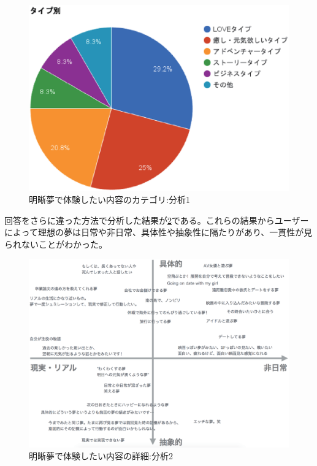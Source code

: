 \begin{figure}[htbp]
\begin{center}
\includegraphics[width=15cm]{eps/dreamType.eps}
\caption{明晰夢で体験したい内容のカテゴリ:分析1}
\label{desiredDreamTpye}
\end{center}
\end{figure}

回答をさらに違った方法で分析した結果が\ref{desiredDreamTpye2}である。これらの結果からユーザーによって理想の夢は日常や非日常、具体性や抽象性に隔たりがあり、一貫性が見られないことがわかった。
\begin{figure}[htbp]
\begin{center}
\includegraphics[width=13cm]{eps/whatYouWantToDream.eps}
\caption{明晰夢で体験したい内容の詳細:分析2}
\label{desiredDreamTpye2}
\end{center}
\end{figure}

